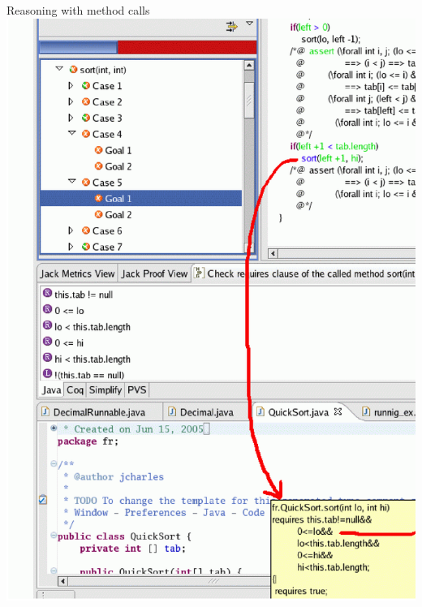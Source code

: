 \documentclass[final,nocolorBG,a4,mobius,nototal,pdf,slideColor]{prosper}
\begin{document}
\begin{slide}{Reasoning with method calls}
\vspace*{-1.5em}
\includegraphics[height=\textheight]{screen4.ps}
\end{slide}
\end{document}
